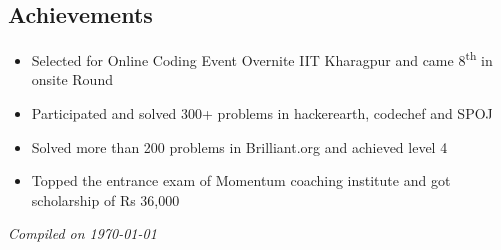 \documentclass[margin,line]{resume}
\begin{document}
\begin{resume}
    \section{\mysidestyle Achievements}
    \begin{itemize}
	        \item Selected for Online Coding Event Overnite IIT Kharagpur and came 8​\textsuperscript{th}​ in onsite Round
	        \item Participated and solved 300+ problems in hackerearth, codechef and SPOJ
	        \item Solved more than 200 problems in Brilliant.org and achieved level 4
	        \item Topped the entrance exam of Momentum coaching institute and got scholarship of Rs 36,000
   \end{itemize}

\hfill \textsl{Compiled on \monthyeardate\today}

\end{resume}
\end{document}
